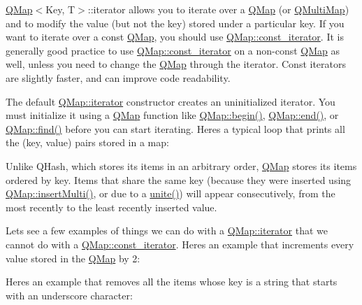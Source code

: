 \hyperlink{class_q_map}{Q\+Map}$<$Key, T$>$\+::iterator allows you to iterate over a \hyperlink{class_q_map}{Q\+Map} (or \hyperlink{class_q_multi_map}{Q\+Multi\+Map}) and to modify the value (but not the key) stored under a particular key. If you want to iterate over a const \hyperlink{class_q_map}{Q\+Map}, you should use \hyperlink{class_q_map_1_1const__iterator}{Q\+Map\+::const\+\_\+iterator}. It is generally good practice to use \hyperlink{class_q_map_1_1const__iterator}{Q\+Map\+::const\+\_\+iterator} on a non-\/const \hyperlink{class_q_map}{Q\+Map} as well, unless you need to change the \hyperlink{class_q_map}{Q\+Map} through the iterator. Const iterators are slightly faster, and can improve code readability.

The default \hyperlink{class_q_map_1_1iterator}{Q\+Map\+::iterator} constructor creates an uninitialized iterator. You must initialize it using a \hyperlink{class_q_map}{Q\+Map} function like \hyperlink{class_q_map_a5712fc69379f2b6d707a1c65391ff9ef}{Q\+Map\+::begin()}, \hyperlink{class_q_map_a2935881385191efbb074e96cf8d3c9b6}{Q\+Map\+::end()}, or \hyperlink{class_q_map_a8cf44b635018eb178cc724ed20379d85}{Q\+Map\+::find()} before you can start iterating. Here\textquotesingle{}s a typical loop that prints all the (key, value) pairs stored in a map\+:


\begin{DoxyCodeInclude}
\end{DoxyCodeInclude}
 Unlike Q\+Hash, which stores its items in an arbitrary order, \hyperlink{class_q_map}{Q\+Map} stores its items ordered by key. Items that share the same key (because they were inserted using \hyperlink{class_q_map_a075634da2cf912a20dd1c4a5835acfa3}{Q\+Map\+::insert\+Multi()}, or due to a \hyperlink{class_q_map_a4626753159700253f441ad14fdc12245}{unite()}) will appear consecutively, from the most recently to the least recently inserted value.

Let\textquotesingle{}s see a few examples of things we can do with a \hyperlink{class_q_map_1_1iterator}{Q\+Map\+::iterator} that we cannot do with a \hyperlink{class_q_map_1_1const__iterator}{Q\+Map\+::const\+\_\+iterator}. Here\textquotesingle{}s an example that increments every value stored in the \hyperlink{class_q_map}{Q\+Map} by 2\+:


\begin{DoxyCodeInclude}
\end{DoxyCodeInclude}
 Here\textquotesingle{}s an example that removes all the items whose key is a string that starts with an underscore character\+:


